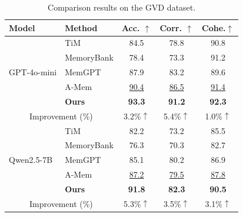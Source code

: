 \documentclass[11pt]{article}
\begin{document}
\begin{table}[t]
\centering
\small
\setlength{\tabcolsep}{2.5pt}
\caption{Comparison results on the GVD dataset.}
\begin{tabular}{llccc}
\toprule
\textbf{Model} & \textbf{Method} & \textbf{Acc. $\uparrow$} & \textbf{Corr. $\uparrow$} & \textbf{Cohe.$\uparrow$}\\
\midrule
\multirow{5}{*}{GPT-4o-mini}
& TiM          & 84.5 & 78.8 & 90.8\\
& MemoryBank   & 78.4 & 73.3 & 91.2\\
& MemGPT       & 87.9 & 83.2 & 89.6\\
& A-Mem        & \underline{90.4} & \underline{86.5} & \underline{91.4}\\
& \textbf{Ours}& \textbf{93.3} & \textbf{91.2} & \textbf{92.3}\\
\midrule
\multicolumn{2}{c}{Improvement (\%)} &3.2$\%\uparrow$&5.4$\%\uparrow$&1.0$\%\uparrow$\\
\midrule
\multirow{5}{*}{Qwen2.5-7B}
& TiM          & 82.2 & 73.2 & 85.5\\
& MemoryBank   & 76.3 & 70.3 & 82.7\\
& MemGPT       & 85.1 & 80.2 & 86.9\\
& A-Mem        & \underline{87.2} & \underline{79.5} & \underline{87.8}\\
& \textbf{Ours}& \textbf{91.8} & \textbf{82.3} & \textbf{90.5}\\
\midrule
\multicolumn{2}{c}{Improvement (\%)} &5.3$\%\uparrow$&3.5$\%\uparrow$&3.1$\%\uparrow$\\
\bottomrule
\end{tabular}
\label{tab:gvd_results}
\end{table}
\end{document}
